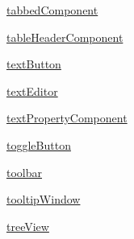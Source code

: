 \begin{DoxyCompactItemize}
 \mbox{\hyperlink{namespaceColourIds_1_1tabbedComponent}{tabbed\+Component}}
\item 
 \mbox{\hyperlink{namespaceColourIds_1_1tableHeaderComponent}{table\+Header\+Component}}
\item 
 \mbox{\hyperlink{namespaceColourIds_1_1textButton}{text\+Button}}
\item 
 \mbox{\hyperlink{namespaceColourIds_1_1textEditor}{text\+Editor}}
\item 
 \mbox{\hyperlink{namespaceColourIds_1_1textPropertyComponent}{text\+Property\+Component}}
\item 
 \mbox{\hyperlink{namespaceColourIds_1_1toggleButton}{toggle\+Button}}
\item 
 \mbox{\hyperlink{namespaceColourIds_1_1toolbar}{toolbar}}
\item 
 \mbox{\hyperlink{namespaceColourIds_1_1tooltipWindow}{tooltip\+Window}}
\item 
 \mbox{\hyperlink{namespaceColourIds_1_1treeView}{tree\+View}}
\end{DoxyCompactItemize}
